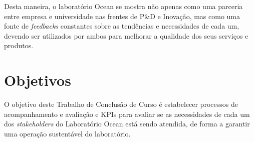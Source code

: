 Desta maneira, o laboratório Ocean se mostra não apenas como uma parceria entre empresa e universidade nas frentes de  P\&D e Inovação, mas como uma fonte de \textit{feedbacks} constantes sobre as tendências e necessidades de cada um, devendo ser utilizados por ambos para melhorar a qualidade dos seus serviços e produtos.

\section[Objetivos]{Objetivos}
\label{chap:objetivos}

O objetivo deste Trabalho de Conclusão de Curso é estabelecer processos de acompanhamento e avaliação e KPIs para avaliar se as necessidades de cada um dos \textit{stakeholders} do Laboratório Ocean está sendo atendida, de forma a garantir uma operação sustentável do laboratório.